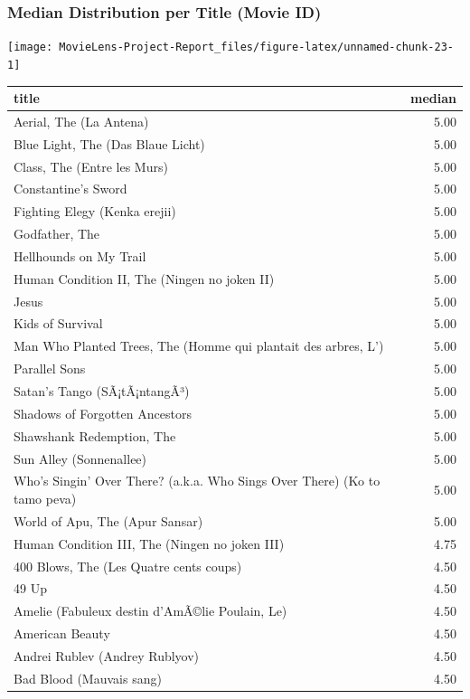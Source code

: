 \documentclass[
]{article}
\begin{document}
\hypertarget{median-distribution-per-title-movie-id}{%
\subsubsection{Median Distribution per Title (Movie
ID)}\label{median-distribution-per-title-movie-id}}

\begin{center}\texttt{[image: MovieLens-Project-Report\_files/figure-latex/unnamed-chunk-23-1]} \end{center}

\begin{table}
\centering\begingroup\fontsize{10}{12}\selectfont

\begin{tabular}{l|r}
\hline
title & median\\
\hline
Aerial, The (La Antena) & 5.00\\
\hline
Blue Light, The (Das Blaue Licht) & 5.00\\
\hline
Class, The (Entre les Murs) & 5.00\\
\hline
Constantine's Sword & 5.00\\
\hline
Fighting Elegy (Kenka erejii) & 5.00\\
\hline
Godfather, The & 5.00\\
\hline
Hellhounds on My Trail & 5.00\\
\hline
Human Condition II, The (Ningen no joken II) & 5.00\\
\hline
Jesus & 5.00\\
\hline
Kids of Survival & 5.00\\
\hline
Man Who Planted Trees, The (Homme qui plantait des arbres, L') & 5.00\\
\hline
Parallel Sons & 5.00\\
\hline
Satan's Tango (SÃ¡tÃ¡ntangÃ³) & 5.00\\
\hline
Shadows of Forgotten Ancestors & 5.00\\
\hline
Shawshank Redemption, The & 5.00\\
\hline
Sun Alley (Sonnenallee) & 5.00\\
\hline
Who's Singin' Over There? (a.k.a. Who Sings Over There) (Ko to tamo peva) & 5.00\\
\hline
World of Apu, The (Apur Sansar) & 5.00\\
\hline
Human Condition III, The (Ningen no joken III) & 4.75\\
\hline
400 Blows, The (Les Quatre cents coups) & 4.50\\
\hline
49 Up & 4.50\\
\hline
Amelie (Fabuleux destin d'AmÃ©lie Poulain, Le) & 4.50\\
\hline
American Beauty & 4.50\\
\hline
Andrei Rublev (Andrey Rublyov) & 4.50\\
\hline
Bad Blood (Mauvais sang) & 4.50\\
\hline
\end{tabular}
\endgroup{}
\end{table}
\end{document}
